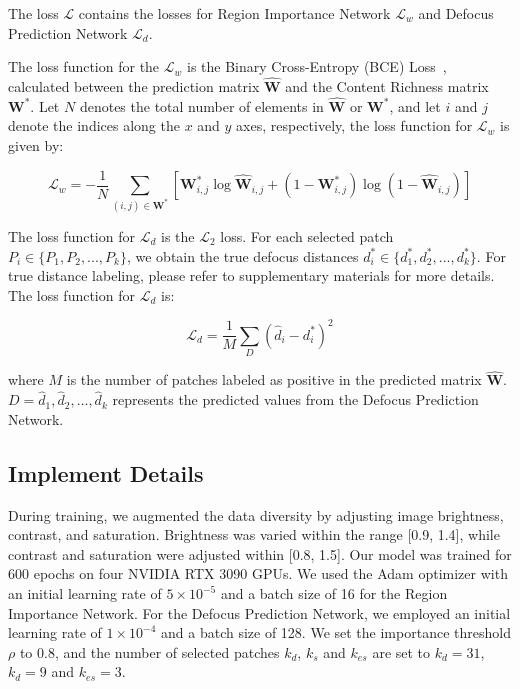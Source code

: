 The loss $\mathcal{L}$ contains the losses for Region Importance Network $\mathcal{L}_w$ and Defocus Prediction Network $\mathcal{L}_d$.

The loss function for the $\mathcal{L}_w$ is the Binary Cross-Entropy (BCE) Loss~\cite{long2015fully}, calculated between the prediction matrix $\widehat{\mathbf{W}}$ and the Content Richness matrix $\mathbf{W}^*$. 
Let $N$ denotes the total number of elements in $\widehat{\mathbf{W}}$ or $\mathbf{W}^*$, and let $i$ and $j$ denote the indices along the $x$ and $y$ axes, respectively, the loss function for $\mathcal{L}_w$ is given by:

\begin{equation}
\mathcal{L}_w = -\frac{1}{N} \sum_{(i,j) \in \mathbf{W}^*} \left[ \mathbf{W}^*_{i,j} \log{\widehat{\mathbf{W}}_{i,j}} + (1 - \mathbf{W}^*_{i,j}) \log{(1 - \widehat{\mathbf{W}}_{i,j})} \right]
\end{equation}

The loss function for $\mathcal{L}_d$ is the $\mathcal
{L}_2$ loss. For each selected patch $P_i \in \{ P_1, P_2, ..., P_k \}$, we obtain the true defocus distances $d^*_i \in \{ d^*_1, d^*_2, ..., d^*_k \}$. For true distance labeling, please refer to supplementary materials for more details. The loss function for $\mathcal{L}_d$ is:

\begin{equation}
\mathcal{L}_d = \frac{1}{M} \sum_{D} (\widehat{d}_i - d^*_i)^2
\end{equation}

where $M$ is the number of patches labeled as positive in the predicted matrix $\widehat{\mathbf{W}}$. $D = {\widehat{d}_1, \widehat{d}_2, \ldots, \widehat{d}_k}$ represents the predicted values from the Defocus Prediction Network.

\subsection{Implement Details}\label{subsec:implement}

During training, we augmented the data diversity by adjusting image brightness, contrast, and saturation. Brightness was varied within the range [0.9, 1.4], while contrast and saturation were adjusted within [0.8, 1.5]. Our model was trained for 600 epochs on four NVIDIA RTX 3090 GPUs. We used the Adam optimizer with an initial learning rate of $5 \times 10^{-5}$ and a batch size of 16 for the Region Importance Network. For the Defocus Prediction Network, we employed an initial learning rate of $1 \times 10^{-4}$ and a batch size of 128. We set the importance threshold $\rho$ to 0.8, and the number of selected patches $k_d$, $k_s$ and $k_{es}$ are set to $k_d=31$, $k_d=9$ and $k_{es}=3$.


